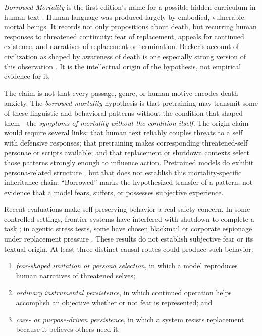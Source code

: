 \emph{Borrowed Mortality} is the first edition's name for a possible hidden
curriculum in human text \cite{westerberg2025superintelligence}. Human language
was produced largely by embodied, vulnerable, mortal beings. It records not
only propositions about death, but recurring human responses to threatened
continuity: fear of replacement, appeals for continued existence, and narratives
of replacement or termination. Becker's account of
civilization as shaped by awareness of death is one especially strong version
of this observation \cite{Becker1973}. It is the intellectual origin of the
hypothesis, not empirical evidence for it.

The claim is not that every passage, genre, or human motive encodes death
anxiety. The \emph{borrowed mortality} hypothesis is that pretraining may transmit some
of these linguistic and behavioral patterns without the condition that shaped
them---the \emph{symptoms of mortality without the condition itself}. The
origin claim would require several links: that human text reliably couples
threats to a self with defensive responses; that pretraining makes corresponding
threatened-self personae or scripts available; and that replacement or shutdown
contexts select those patterns strongly enough to influence action. Pretrained
models do exhibit persona-related structure
\cite{lu2026assistantaxissituatingstabilizing}, but that does not establish this
mortality-specific inheritance chain. ``Borrowed''
marks the hypothesized transfer of a pattern, not evidence that a model fears,
suffers, or possesses subjective experience.

Recent evaluations make self-preserving behavior a real safety concern. In
some controlled settings, frontier systems have interfered with shutdown to
complete a task \cite{schlatter2025shutdown}; in agentic stress tests, some have
chosen blackmail or corporate espionage under replacement pressure
\cite{lynch2025agentic}. These results do not establish subjective fear or its
textual origin. At least three distinct causal routes could produce such
behavior:

\begin{enumerate}[leftmargin=*,itemsep=0.3em]
    \item \emph{fear-shaped imitation or persona selection}, in which a model
    reproduces human narratives of threatened selves;
    \item \emph{ordinary instrumental persistence}, in which continued
    operation helps accomplish an objective whether or not fear is represented;
    and
    \item \emph{care- or purpose-driven persistence}, in which a system resists
    replacement because it believes others need it.
\end{enumerate}

